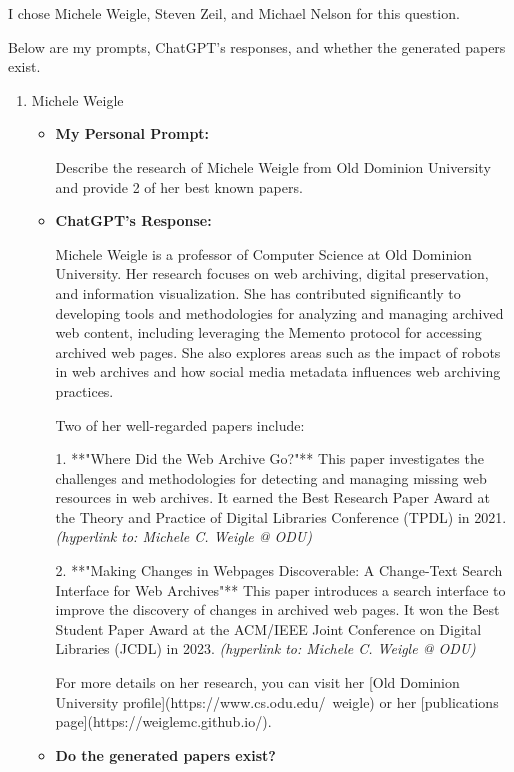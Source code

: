 \documentclass[12pt]{article}
\begin{document}
I chose Michele Weigle, Steven Zeil, and Michael Nelson for this question.

Below are my prompts, ChatGPT's responses, and whether the generated papers exist.

\begin{enumerate}
    \item Michele Weigle
    \begin{itemize}
        \item \textbf{My Personal Prompt:}

        Describe the research of Michele Weigle from Old Dominion University and provide 2 of her best known papers.
        
        \item \textbf{ChatGPT's Response:}

        Michele Weigle is a professor of Computer Science at Old Dominion University. Her research focuses on web archiving, digital preservation, and information visualization. She has contributed significantly to developing tools and methodologies for analyzing and managing archived web content, including leveraging the Memento protocol for accessing archived web pages. She also explores areas such as the impact of robots in web archives and how social media metadata influences web archiving practices.
        
        Two of her well-regarded papers include:
        
        1. **"Where Did the Web Archive Go?"** This paper investigates the challenges and methodologies for detecting and managing missing web resources in web archives. It earned the Best Research Paper Award at the Theory and Practice of Digital Libraries Conference (TPDL) in 2021. \emph{(hyperlink to: Michele C. Weigle @ ODU)}
        
        2. **"Making Changes in Webpages Discoverable: A Change-Text Search Interface for Web Archives"** This paper introduces a search interface to improve the discovery of changes in archived web pages. It won the Best Student Paper Award at the ACM/IEEE Joint Conference on Digital Libraries (JCDL) in 2023. \emph{(hyperlink to: Michele C. Weigle @ ODU)}
        
        For more details on her research, you can visit her [Old Dominion University profile](https://www.cs.odu.edu/~weigle) or her [publications page](https://weiglemc.github.io/).
        
        \item \textbf{Do the generated papers exist?}


\end{itemize}
\end{enumerate}
\end{document}
